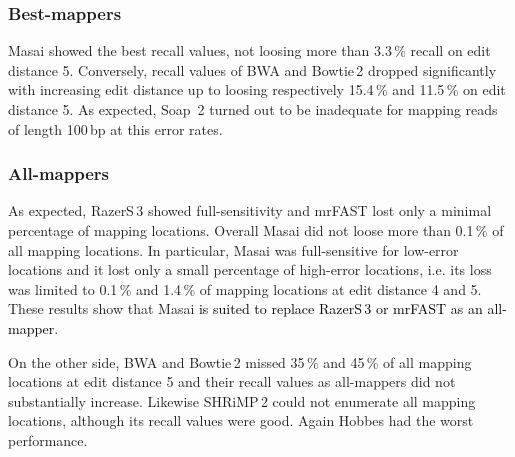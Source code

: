 \documentclass[a4,center,fleqn]{article}
\newcommand\subcolbeg{\setlength{\extrarowheight}{.0ex}\renewcommand{\tabcolsep}{1pt}\tiny}
\newcommand\subcolend{\setlength{\extrarowheight}{.4ex}}
\newcommand\subcolvspace{\vspace{.02ex}}
\newcommand{\ie}{{i.e.}\xspace}
\begin{document}

\subsubsection{Best-mappers}
Masai showed the best recall values, not loosing more than 3.3\,\% recall on edit distance 5.
Conversely, recall values of BWA and Bowtie\,2 dropped significantly with increasing edit distance up to loosing respectively 15.4\,\% and 11.5\,\% on edit distance 5.
As expected, Soap \,2 turned out to be inadequate for mapping reads of length 100\,bp at this error rates.



\subsubsection{All-mappers}
As expected, RazerS\,3 showed full-sensitivity and mrFAST lost only a minimal percentage of mapping locations.
Overall Masai did not loose more than 0.1\,\% of all mapping locations.
In particular, Masai was full-sensitive for low-error locations and it lost only a small percentage of high-error locations, \ie its loss was limited to 0.1\,\% and 1.4\,\% of mapping locations at edit distance 4 and 5.
These results show that Masai \textcolor{black}{is suited to replace RazerS\,3 or mrFAST as an all-mapper}.

On the other side, BWA and Bowtie\,2 missed 35\,\% and 45\,\% of all mapping locations at edit distance 5 and their recall values as all-mappers did not substantially increase.
Likewise SHRiMP\,2 could not enumerate all mapping locations, although its recall values were good.
Again Hobbes had the worst performance.
\end{document}
